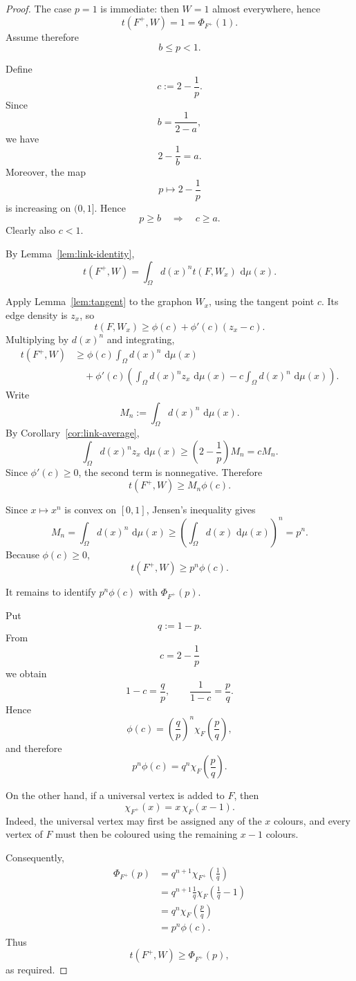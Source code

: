 \documentclass[11pt]{article}
\newcommand{\1}{\mathbf{1}}
\newcommand{\dd}{\,\mathrm{d}}
\begin{document}
\begin{proof}
The case $p=1$ is immediate: then $W=1$ almost everywhere, hence
\[
t(F^+,W)=1=\Phi_{F^+}(1).
\]
Assume therefore
\[
b\le p<1.
\]

Define
\[
c:=2-\frac1p.
\]
Since
\[
b=\frac1{2-a},
\]
we have
\[
2-\frac1b=a.
\]
Moreover, the map
\[
p\longmapsto 2-\frac1p
\]
is increasing on $(0,1]$.  Hence
\[
p\ge b
\quad\Longrightarrow\quad
c\ge a.
\]
Clearly also $c<1$.

By Lemma~\ref{lem:link-identity},
\[
t(F^+,W)
=
\int_\Omega
d(x)^n t(F,W_x)\,\dd\mu(x).
\]

Apply Lemma~\ref{lem:tangent} to the graphon $W_x$, using the tangent
point $c$.  Its edge density is $z_x$, so
\[
t(F,W_x)
\ge
\phi(c)+\phi'(c)(z_x-c).
\]
Multiplying by $d(x)^n$ and integrating,
\begin{align*}
t(F^+,W)
&\ge
\phi(c)\int_\Omega d(x)^n\,\dd\mu(x)
\\
&\quad+
\phi'(c)
\left(
\int_\Omega d(x)^nz_x\,\dd\mu(x)
-
c\int_\Omega d(x)^n\,\dd\mu(x)
\right).
\end{align*}
Write
\[
M_n:=\int_\Omega d(x)^n\,\dd\mu(x).
\]
By Corollary~\ref{cor:link-average},
\[
\int_\Omega d(x)^nz_x\,\dd\mu(x)
\ge
\left(2-\frac1p\right)M_n
=
cM_n.
\]
Since $\phi'(c)\ge0$, the second term is nonnegative.  Therefore
\[
t(F^+,W)\ge M_n\phi(c).
\]

Since $x\mapsto x^n$ is convex on $[0,1]$, Jensen's inequality gives
\[
M_n
=
\int_\Omega d(x)^n\,\dd\mu(x)
\ge
\left(
\int_\Omega d(x)\,\dd\mu(x)
\right)^n
=
p^n.
\]
Because $\phi(c)\ge0$,
\[
t(F^+,W)\ge p^n\phi(c).
\]

It remains to identify $p^n\phi(c)$ with
$\Phi_{F^+}(p)$.

Put
\[
q:=1-p.
\]
From
\[
c=2-\frac1p
\]
we obtain
\[
1-c
=
\frac{q}{p},
\qquad
\frac1{1-c}
=
\frac{p}{q}.
\]
Hence
\[
\phi(c)
=
\left(\frac qp\right)^n
\chi_F\!\left(\frac pq\right),
\]
and therefore
\[
p^n\phi(c)
=
q^n\chi_F\!\left(\frac pq\right).
\]

On the other hand, if a universal vertex is added to $F$, then
\[
\chi_{F^+}(x)
=
x\,\chi_F(x-1).
\]
Indeed, the universal vertex may first be assigned any of the $x$
colours, and every vertex of $F$ must then be coloured using the
remaining $x-1$ colours.

Consequently,
\begin{align*}
\Phi_{F^+}(p)
&=
q^{n+1}
\chi_{F^+}\!\left(\frac1q\right)
\\
&=
q^{n+1}
\frac1q
\chi_F\!\left(\frac1q-1\right)
\\
&=
q^n
\chi_F\!\left(\frac pq\right)
\\
&=
p^n\phi(c).
\end{align*}
Thus
\[
t(F^+,W)\ge\Phi_{F^+}(p),
\]
as required.
\end{proof}
\end{document}
